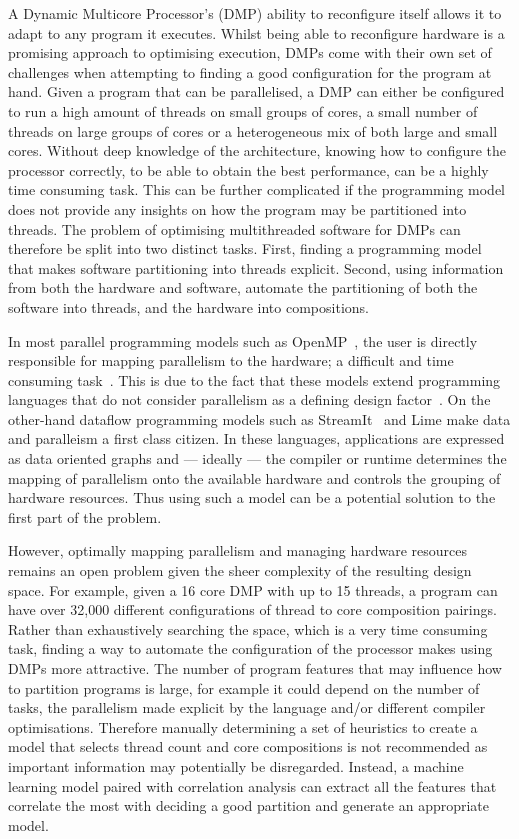 A Dynamic Multicore Processor's (DMP) ability to reconfigure itself allows it to adapt to any program it executes.
Whilst being able to reconfigure hardware is a promising approach to optimising execution, DMPs come with their own set of challenges when attempting to finding a good configuration for the program at hand.
Given a program that can be parallelised, a DMP can either be configured to run a high amount of threads on small groups of cores, a small number of threads on large groups of cores or a heterogeneous mix of both large and small cores.
Without deep knowledge of the architecture, knowing how to configure the processor correctly, to be able to obtain the best performance, can be a highly time consuming task.
This can be further complicated if the programming model does not provide any insights on how the program may be partitioned into threads.
The problem of optimising multithreaded software for DMPs can therefore be split into two distinct tasks.
First, finding a programming model that makes software partitioning into threads explicit.
Second, using information from both the hardware and software, automate the partitioning of both the software into threads, and the hardware into compositions.

In most parallel programming models such as OpenMP~\cite{openmp}, the user is directly responsible for mapping parallelism to the hardware; a difficult and time consuming task~\cite{prabhu2011LanguagePar}.
This is due to the fact that these models extend programming languages that do not consider parallelism as a defining design factor~\cite{pingaliTao2011}.
On the other-hand dataflow programming models such as StreamIt~\cite{theis2002streamit} and Lime \cite{auerbach2012lime} make data and paralleism a first class citizen.
In these languages, applications are expressed as data oriented graphs and --- ideally --- the compiler or runtime determines the mapping of parallelism onto the available hardware and controls the grouping of hardware resources.
Thus using such a model can be a potential solution to the first part of the problem.

However, optimally mapping parallelism and managing hardware resources remains an open problem given the sheer complexity of the resulting design space.
For example, given a 16 core DMP with up to 15 threads, a program can have over 32,000 different configurations of thread to core composition pairings.
Rather than exhaustively searching the space, which is a very time consuming task, finding a way to automate the configuration of the processor makes using DMPs more attractive.
The number of program features that may influence how to partition programs is large, for example it could depend on the number of tasks, the parallelism made explicit by the language and/or different compiler optimisations.
Therefore manually determining a set of heuristics to create a model that selects thread count and core compositions is not recommended as important information may potentially be disregarded.
Instead, a machine learning model paired with correlation analysis can extract all the features that correlate the most with deciding a good partition and generate an appropriate model.

